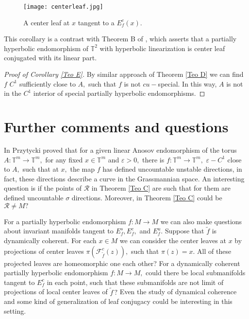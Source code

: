 \documentclass[12pt,reqno]{amsart}
\numberwithin{equation}{section}
\theoremstyle{plain}
\theoremstyle{remark}
\begin{document}
\begin{figure}[!h]
\centerline{
\texttt{[image: centerleaf.jpg]}}
\caption{{\small A center leaf at $x$ tangent to a $E^c_f(x)$}.}
\label{figsemi}
\end{figure}

This corollary is a contrast with Theorem B  of \cite{HH21}, which asserts that a partially hyperbolic endomorphism of $\mathbb{T}^2$ with hyperbolic linearization is center leaf conjugated with its linear part.





\begin{proof}[Proof of Corollary \ref{Teo E}]  By similar approach of Theorem \ref{Teo D} we can find $f$ $C^1$ sufficiently close to $A,$ such that $f$ is not $cu-$special. In this way, $A$ is not in the $C^1$ interior of special partially hyperbolic endomorphisms.

\end{proof}

















\section{Further comments and questions }

In \cite{PRZ} Przytycki proved that for a given linear Anosov endomorphism of the torus $A: \mathbb{T}^m \rightarrow \mathbb{T}^m ,$  for any fixed $x \in \mathbb{T}^m$ and $\varepsilon > 0, $ there is $f: \mathbb{T}^m \rightarrow \mathbb{T}^m,$ $\varepsilon-C^1$ close to $A,$ such that at $x,$ the map $f$  has defined uncountable unstable directions, in fact, these directions describe a curve in the Grassmannian space. An interesting question is if the points of $\mathcal{R}$ in Theorem \ref{Teo C} are such that for them are defined uncountable $\sigma$ directions. Moreover, in Theorem \ref{Teo C} could be $\mathcal{R} \neq M ?$


For a partially hyperbolic endomorphism $f:M \rightarrow M$  we can also make questions about invariant manifolds tangent to $E^s_f, E^c_f,$ and $E^u_f.$  Suppose that  $\widetilde{f}$ is dynamically coherent. For each $x \in M$ we can consider the center leaves at $x$ by projections of center leaves $\pi(\mathcal{F}^c_{\widetilde{f}}(z)),$ such that $\pi(z) = x.$ All of these projected leaves are homeomorphic one each other? For a dynamically coherent partially hyperbolic endomorphism $f: M \rightarrow M,$ could there be local submanifolds tangent to  $E^c_f$ in each point, such that these submanifolds are not limit of projections of local center leaves of $\widetilde{f}\,?$ Even the study of dynamical coherence and some kind of generalization of leaf conjugacy could be interesting in this setting.
\end{document}
